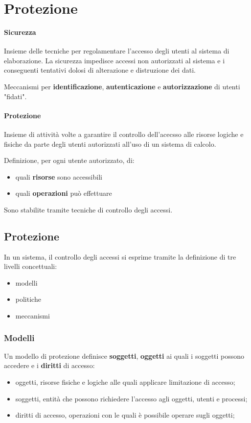 \chapter{Protezione}
    
\subsubsection{Sicurezza}
Insieme delle tecniche per regolamentare l'accesso degli utenti al sistema di elaborazione. La sicurezza impedisce accessi non autorizzati al sistema e i conseguenti tentativi dolosi di alterazione e distruzione dei dati.

Meccanismi per \textbf{identificazione}, \textbf{autenticazione} e \textbf{autorizzazione} di utenti "fidati".
    	
\subsubsection{Protezione}
Insieme di attività volte a garantire il controllo dell'acecsso alle risorse logiche e fisiche da parte degli utenti autorizzati all'uso di un sistema di calcolo.

Definizione, per ogni utente autorizzato, di:
\begin{itemize}
	\item quali \textbf{risorse} sono accessibili
	\item quali \textbf{operazioni} può effettuare
\end{itemize}

Sono stabilite tramite tecniche di controllo degli accessi.

\section{Protezione}
In un sistema, il controllo degli accessi si esprime tramite la definizione di tre livelli concettuali:
\begin{itemize}
	\item modelli
	\item politiche
	\item meccanismi
\end{itemize}

\subsection{Modelli}
Un modello di protezione definisce \textbf{soggetti}, \textbf{oggetti} ai quali i soggetti possono accedere e i \textbf{diritti} di accesso:
\begin{itemize}
	\item oggetti, risorse fisiche e logiche alle quali applicare limitazione di accesso;
	\item soggetti, entità che possono richiedere l'accesso agli oggetti, utenti e processi;
	\item diritti di accesso, operazioni con le quali è possibile operare sugli oggetti;
\end{itemize}

